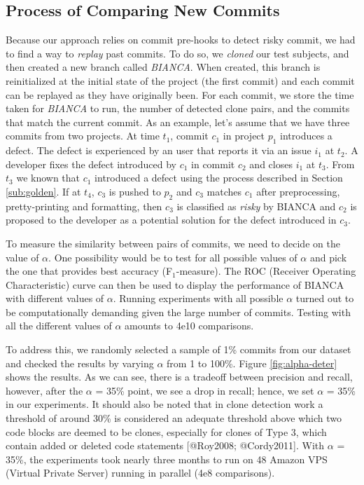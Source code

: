\subsection{Process of Comparing New Commits}\label{sec:newcommits}

Because our approach relies on commit pre-hooks to detect risky commit,
we had to find a way to \emph{replay} past commits. To do so, we
\emph{cloned} our test subjects, and then created a new branch called
\emph{BIANCA}. When created, this branch is reinitialized at the initial
state of the project (the first commit) and each commit can be replayed
as they have originally been. For each commit, we store the time taken
for \emph{BIANCA} to run, the number of detected clone pairs, and the
commits that match the current commit. As an example, let's assume that
we have three commits from two projects. At time \(t_1\), commit \(c_1\)
in project \(p_1\) introduces a defect. The defect is experienced by an
user that reports it via an issue \(i_1\) at \(t_2\). A developer fixes
the defect introduced by \(c_1\) in commit \(c_2\) and closes \(i_1\) at
\(t_3\). From \(t_3\) we known that \(c_1\) introduced a defect using
the process described in Section \ref{sub:golden}. If at \(t_4\),
\(c_3\) is pushed to \(p_2\) and \(c_3\) matches \(c_1\) after
preprocessing, pretty-printing and formatting, then \(c_3\) is
classified as \emph{risky} by BIANCA and \(c_2\) is proposed to the
developer as a potential solution for the defect introduced in \(c_3\).



To measure the similarity between pairs of commits, we need to decide on
the value of \(\alpha\). One possibility would be to test for all
possible values of \(\alpha\) and pick the one that provides best
accuracy (F\(_1\)-measure). The ROC (Receiver Operating Characteristic)
curve can then be used to display the performance of BIANCA with
different values of \(\alpha\). Running experiments with all possible
\(\alpha\) turned out to be computationally demanding given the large
number of commits. Testing with all the different values of \(\alpha\)
amounts to 4e10 comparisons.

To address this, we randomly selected a sample of 1\% commits from our
dataset and checked the results by varying \(\alpha\) from 1 to 100\%.
Figure \ref{fig:alpha-deter} shows the results. As we can see, there is
a tradeoff between precision and recall, however, after the \(\alpha\) =
35\% point, we see a drop in recall; hence, we set \(\alpha\) = 35\% in
our experiments. It should also be noted that in clone detection work a
threshold of around 30\% is considered an adequate threshold above which
two code blocks are deemed to be clones, especially for clones of Type
3, which contain added or deleted code statements {[}@Roy2008;
@Cordy2011{]}. With \(\alpha\) = 35\%, the experiments took nearly three
months to run on 48 Amazon VPS (Virtual Private Server) running in
parallel (4e8 comparisons).

